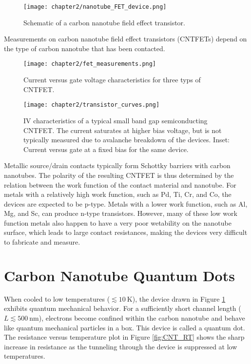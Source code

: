 \begin{figure}
    \centering
    \texttt{[image: chapter2/nanotube\_FET\_device.png]}
    \caption{Schematic of a carbon nanotube field effect transistor.}
    \label{fig:nanotube_fet}
\end{figure}

Measurements on carbon nanotube field effect transistors (CNTFETs) depend on the type of carbon nanotube that has been contacted.

\begin{figure}
    \centering
    \texttt{[image: chapter2/fet\_measurements.png]}
    \caption{Current versus gate voltage characteristics for three typs of CNTFET.}
    \label{fig:fet_measurements}
\end{figure}

\begin{figure}
    \centering
    \texttt{[image: chapter2/transistor\_curves.png]}
    \caption{IV characteristics of a typical small band gap semiconducting CNTFET. The current saturates at higher bias voltage, but is not typically measured due to avalanche breakdown of the devices. Inset: Current versus gate at a fixed bias for the same device.}
    \label{transistor_curves.png}
\end{figure}

Metallic source/drain contacts typically form Schottky barriers with carbon nanotubes. The polarity of the resulting CNTFET is thus determined by the relation between the work function of the contact material and nanotube. For metals with a relatively high work function, such as Pd, Ti, Cr, and Co, the devices are expected to be p-type. Metals with a lower work function, such as Al, Mg, and Sc, can produce n-type transistors. However, many of these low work function metals also happen to have a very poor wetability on the nanotube surface, which leads to large contact resistances, making the devices very difficult to fabricate and measure.

\section{Carbon Nanotube Quantum Dots}

When cooled to low temperatures ($\lesssim \SI{10}{\kelvin}$), the device drawn in Figure \ref{fig:nanotube_fet} exhibits quantum mechanical behavior. For a sufficiently short channel length ($L \lesssim \SI{500}{\nano\meter}$), electrons become confined within the carbon nanotube and behave like quantum mechanical particles in a box. This device is called a quantum dot. The resistance versus temperature plot in Figure \ref{fig:CNT_RT} shows the sharp increase in resistance as the tunneling through the device is suppressed at low temperatures. 

